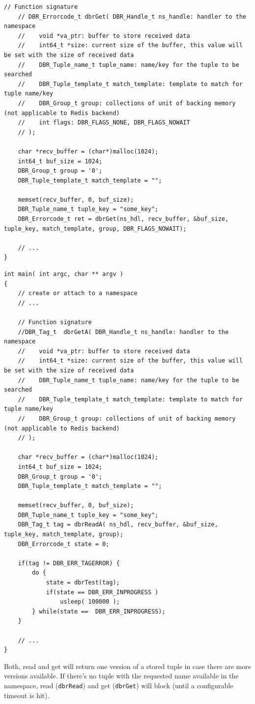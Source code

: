 \begin{enumerate}
\begin{lstlisting}[style=mystyle,basicstyle=\scriptsize\ttfamily,caption=Get data from the namespace (blocking), label=code:get]
    // Function signature
    // DBR_Errorcode_t dbrGet( DBR_Handle_t ns_handle: handler to the namespace
    //    void *va_ptr: buffer to store received data
    //    int64_t *size: current size of the buffer, this value will be set with the size of received data 
    //    DBR_Tuple_name_t tuple_name: name/key for the tuple to be searched
    //    DBR_Tuple_template_t match_template: template to match for tuple name/key
    //    DBR_Group_t group: collections of unit of backing memory (not applicable to Redis backend)
    //    int flags: DBR_FLAGS_NONE, DBR_FLAGS_NOWAIT
    // );

	char *recv_buffer = (char*)malloc(1024);
	int64_t buf_size = 1024;
	DBR_Group_t group = '0';
	DBR_Tuple_template_t match_template = "";
	
	memset(recv_buffer, 0, buf_size);
	DBR_Tuple_name_t tuple_key = "some_key";
	DBR_Errorcode_t ret = dbrGet(ns_hdl, recv_buffer, &buf_size, tuple_key, match_template, group, DBR_FLAGS_NOWAIT);
	
	// ...
}
\end{lstlisting}

  \begin{lstlisting}[style=mystyle,basicstyle=\scriptsize\ttfamily,caption=Get data from the namespace (non-blocking), label=code:getA]
int main( int argc, char ** argv )
{
	// create or attach to a namespace
	// ...

    // Function signature
    //DBR_Tag_t  dbrGetA( DBR_Handle_t ns_handle: handler to the namespace 
    //    void *va_ptr: buffer to store received data
    //    int64_t *size: current size of the buffer, this value will be set with the size of received data 
    //    DBR_Tuple_name_t tuple_name: name/key for the tuple to be searched
    //    DBR_Tuple_template_t match_template: template to match for tuple name/key
    //    DBR_Group_t group: collections of unit of backing memory (not applicable to Redis backend)
    // );
	
	char *recv_buffer = (char*)malloc(1024);
	int64_t buf_size = 1024;
	DBR_Group_t group = '0';
	DBR_Tuple_template_t match_template = "";

	memset(recv_buffer, 0, buf_size);
	DBR_Tuple_name_t tuple_key = "some_key";
	DBR_Tag_t tag = dbrReadA( ns_hdl, recv_buffer, &buf_size, tuple_key, match_template, group);
	DBR_Errorcode_t state = 0; 

	if(tag != DBR_ERR_TAGERROR) {
		do {
			state = dbrTest(tag);
			if(state == DBR_ERR_INPROGRESS )
				usleep( 100000 );
		} while(state ==  DBR_ERR_INPROGRESS);
	}
	
	// ...
}
\end{lstlisting}
Both, read and get will return one version of a stored tuple in case
there are more versions available.  If there's no tuple with the
requested name available in the namespace, read (\texttt{dbrRead}) and get (\texttt{dbrGet}) will block
(until a configurable timeout is hit). 
\end{enumerate}


